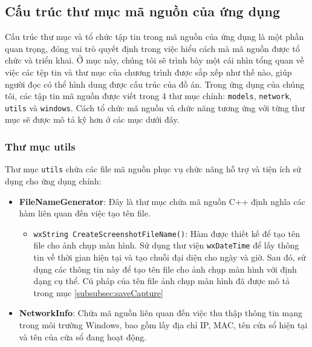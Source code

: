 \subsection{Cấu trúc thư mục mã nguồn của ứng dụng}
Cấu trúc thư mục và tổ chức tập tin trong mã nguồn của ứng dụng là một phần quan trọng, đóng vai trò quyết định trong việc hiểu cách mà mã nguồn được tổ chức và triển khai. Ở mục này, chúng tôi sẽ trình bày một cái nhìn tổng quan về việc các tệp tin và thư mục của chương trình được sắp xếp như thế nào, giúp người đọc có thể hình dung được cấu trúc của đồ án.
Trong ứng dụng của chúng tôi, các tập tin mã nguồn được viết trong 4 thư mục chính: \verb|models|, \verb|network|, \verb|utils| và \verb|windows|. Cách tổ chức mã nguồn và chức năng tương ứng với từng thư mục sẽ được mô tả kỹ hơn ở các mục dưới đây.

\subsubsection{Thư mục utils}
Thư mục \verb|utils| chứa các file mã nguồn phục vụ chức năng hỗ trợ và tiện ích sử dụng cho ứng dụng chính:
\begin{itemize}
	\item \textbf{FileNameGenerator}: Đây là thư mục chứa mã nguồn C++ định nghĩa các hàm liên quan đến việc tạo tên file.
	\begin{itemize}
		\item \lstinline{wxString CreateScreenshotFileName()}: Hàm được thiết kế để tạo tên file cho ảnh chụp màn hình. Sử dụng thư viện \lstinline{wxDateTime} để lấy thông tin về thời gian hiện tại và tạo chuỗi đại diện cho ngày và giờ. Sau đó, sử dụng các thông tin này để tạo tên file cho ảnh chụp màn hình với định dạng cụ thể. Cú pháp của tên file ảnh chụp màn hình đã được mô tả trong mục \ref{subsubsec:saveCapture}
	\end{itemize}
	\item \textbf{NetworkInfo}: Chứa mã nguồn liên quan đến việc thu thập thông tin mạng trong môi trường Windows, bao gồm lấy địa chỉ IP, MAC, tên cửa sổ hiện tại và tên của cửa sổ đang hoạt động.
\end{itemize}

